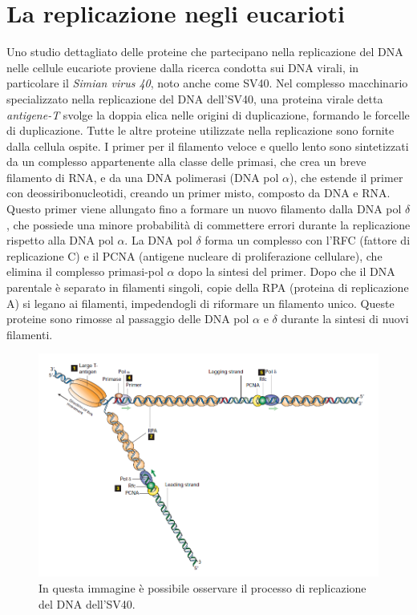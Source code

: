 \documentclass[11pt]{report}
\begin{document}
	\section{La replicazione negli eucarioti}
	
	Uno studio dettagliato delle proteine che partecipano nella replicazione del DNA nelle cellule eucariote proviene dalla ricerca condotta sui DNA virali, in particolare il \textit{Simian virus 40}, noto anche come SV40. Nel complesso macchinario specializzato nella replicazione del DNA dell'SV40, una proteina virale detta \textit{antigene-T} svolge la doppia elica nelle origini di duplicazione, formando le forcelle di duplicazione. Tutte le altre proteine utilizzate nella replicazione sono fornite dalla cellula ospite. I primer per il filamento veloce e quello lento sono sintetizzati da un complesso appartenente alla classe delle primasi, che crea un breve filamento di RNA, e da una DNA polimerasi (DNA pol $\alpha$), che estende il primer con deossiribonucleotidi, creando un primer misto, composto da DNA e RNA. Questo primer viene allungato fino a formare un nuovo filamento dalla DNA pol $\delta$, che possiede una minore probabilità di commettere errori durante la replicazione rispetto alla DNA pol $\alpha$. La DNA pol $\delta$ forma un complesso con l'RFC (fattore di replicazione C) e il PCNA (antigene nucleare di proliferazione cellulare), che elimina il complesso primasi-pol $\alpha$ dopo la sintesi del primer. Dopo che il DNA parentale è separato in filamenti singoli, copie della RPA (proteina di replicazione A) si legano ai filamenti, impedendogli di riformare un filamento unico. Queste proteine sono rimosse al passaggio delle DNA pol $\alpha$ e $\delta$ durante la sintesi di nuovi filamenti.\\
	
	\begin{figure}[h]
		\centering
		\includegraphics[width=\textwidth]{SV40.png}	
		\caption{{\small In questa immagine è possibile osservare il processo di replicazione del DNA dell'SV40.\cite{lodish2008molecular}}}
	\end{figure}
	
\end{document}
